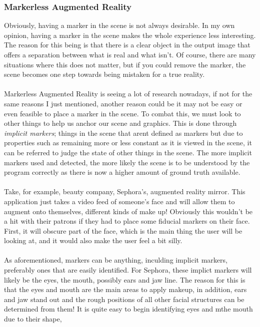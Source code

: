 \documentclass[11pt]{article}
\begin{document}
\subsubsection{Markerless Augmented Reality}
Obviously, having a marker in the scene is not always desirable.
In my own opinion, having a marker in the scene makes the whole
experience less interesting. The reason for this being is that there is
a clear object in the output image that offers a  
separation between what is real and what isn't. Of course, there
are many situations where this does not matter, but if you could 
remove the marker, the scene becomes one step towards being mistaken
for a true reality.\\
\\
Markerless Augmented Reality is seeing a lot of research nowadays, if not
for the same reasons I just mentioned, another reason could be it may not 
be easy or even feasible to place a marker in the scene. 
To combat this, we must
look to other things to help us anchor our scene and graphics. This is done
through \textit{implicit markers}; things in the scene that arent defined
as markers but due to properties such as remaining more or less constant 
as it is viewed in the scene, it can be referred to judge the state of other
things in the scene. The more implicit markers used and detected, the more
likely the scene is to be understood by the program correctly as there is
now a higher amount of ground truth available.\\
\\
Take, for example, beauty company, Sephora's, augmented reality mirror.
This application just takes a video feed of someone's face and will allow
them to augment onto themselves, different kinds of make up! Obviously 
this wouldn't be a hit with their patrons if they had to place some 
fiducial markers on their face. First, it will obscure part of the face, 
which is the main thing
the user will be looking at, and it would also make the user feel a bit 
silly. \\
\\
As aforementioned, markers can be anything, inculding implicit markers,
preferably ones that are easily identified. For Sephora, these implict
markers will likely be the eyes, the mouth, possibly ears and jaw line.
The reason for this is that the eyes and mouth are the main areas to
apply makeup, in addition, ears and jaw stand out and the rough positions
of all other facial structures can be determined from them! It is quite
easy to begin identifying eyes and mthe mouth due to their shape, 
\end{document}
